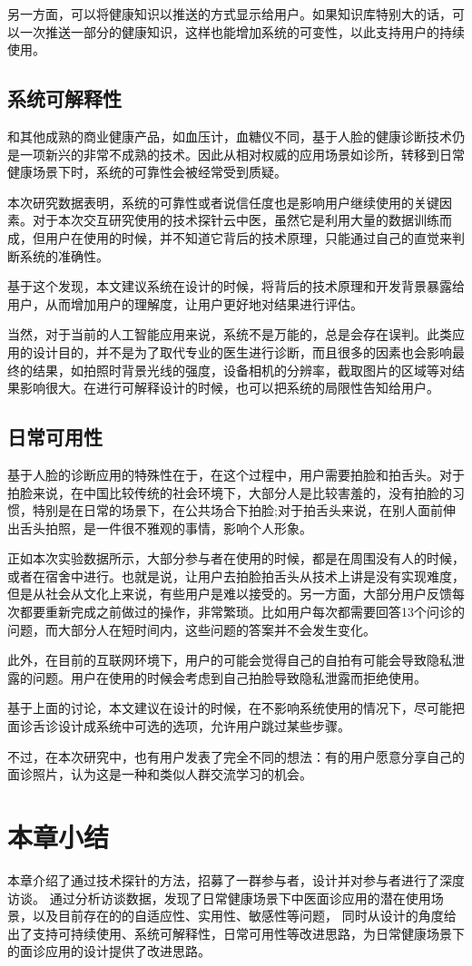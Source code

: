 另一方面，可以将健康知识以推送的方式显示给用户。如果知识库特别大的话，可以一次推送一部分的健康知识，这样也能增加系统的可变性，以此支持用户的持续使用。

\subsection{系统可解释性}

和其他成熟的商业健康产品，如血压计，血糖仪不同，基于人脸的健康诊断技术仍是一项新兴的非常不成熟的技术。因此从相对权威的应用场景如诊所，转移到日常健康场景下时，系统的可靠性会被经常受到质疑。

本次研究数据表明，系统的可靠性或者说信任度也是影响用户继续使用的关键因素。对于本次交互研究使用的技术探针云中医，虽然它是利用大量的数据训练而成，但用户在使用的时候，并不知道它背后的技术原理，只能通过自己的直觉来判断系统的准确性。

基于这个发现，本文建议系统在设计的时候，将背后的技术原理和开发背景暴露给用户，从而增加用户的理解度，让用户更好地对结果进行评估。

当然，对于当前的人工智能应用来说，系统不是万能的，总是会存在误判。此类应用的设计目的，并不是为了取代专业的医生进行诊断，而且很多的因素也会影响最终的结果，如拍照时背景光线的强度，设备相机的分辨率，截取图片的区域等对结果影响很大。在进行可解释设计的时候，也可以把系统的局限性告知给用户。

\subsection{日常可用性}
基于人脸的诊断应用的特殊性在于，在这个过程中，用户需要拍脸和拍舌头。对于拍脸来说，在中国比较传统的社会环境下，大部分人是比较害羞的，没有拍脸的习惯，特别是在日常的场景下，在公共场合下拍脸;对于拍舌头来说，在别人面前伸出舌头拍照，是一件很不雅观的事情，影响个人形象。

正如本次实验数据所示，大部分参与者在使用的时候，都是在周围没有人的时候，或者在宿舍中进行。也就是说，让用户去拍脸拍舌头从技术上讲是没有实现难度，但是从社会从文化上来说，有些用户是难以接受的。另一方面，大部分用户反馈每次都要重新完成之前做过的操作，非常繁琐。比如用户每次都需要回答13个问诊的问题，而大部分人在短时间内，这些问题的答案并不会发生变化。

此外，在目前的互联网环境下，用户的可能会觉得自己的自拍有可能会导致隐私泄露的问题。用户在使用的时候会考虑到自己拍脸导致隐私泄露而拒绝使用。

基于上面的讨论，本文建议在设计的时候，在不影响系统使用的情况下，尽可能把面诊舌诊设计成系统中可选的选项，允许用户跳过某些步骤。

不过，在本次研究中，也有用户发表了完全不同的想法：有的用户愿意分享自己的面诊照片，认为这是一种和类似人群交流学习的机会。

\section{本章小结}


本章介绍了通过技术探针的方法，招募了一群参与者，设计并对参与者进行了深度访谈。
通过分析访谈数据，发现了日常健康场景下中医面诊应用的潜在使用场景，以及目前存在的的自适应性、实用性、敏感性等问题，
同时从设计的角度给出了支持可持续使用、系统可解释性，日常可用性等改进思路，为日常健康场景下的面诊应用的设计提供了改进思路。


